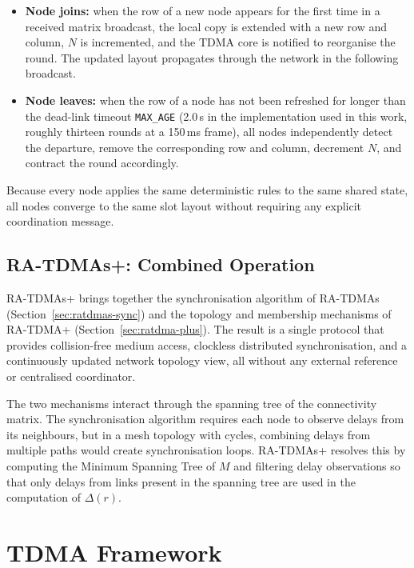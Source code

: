 \begin{itemize}
  \item \textbf{Node joins:} when the row of a new node appears for the
    first time in a received matrix broadcast, the local copy is
    extended with a new row and column, $N$ is incremented, and the
    TDMA core is notified to reorganise the round. The updated layout
    propagates through the network in the following broadcast.

  \item \textbf{Node leaves:} when the row of a node has not been refreshed
    for longer than the dead-link timeout \texttt{MAX\_AGE} (2.0\,s in
    the implementation used in this work, roughly thirteen rounds at a
    150\,ms frame), all nodes independently detect the departure,
    remove the corresponding row and column, decrement $N$, and contract
    the round accordingly.
\end{itemize}

Because every node applies the same deterministic rules to the same
shared state, all nodes converge to the same slot layout without
requiring any explicit coordination message.

\subsection{RA-TDMAs+: Combined Operation}

RA-TDMAs+ brings together the synchronisation algorithm of RA-TDMAs
(Section~\ref{sec:ratdmas-sync}) and the topology and membership
mechanisms of RA-TDMA+ (Section~\ref{sec:ratdma-plus}). The result
is a single protocol that provides collision-free medium access,
clockless distributed synchronisation, and a continuously updated
network topology view, all without any external reference or
centralised coordinator.

The two mechanisms interact through the spanning tree of the
connectivity matrix. The synchronisation algorithm requires each
node to observe delays from its neighbours, but in a mesh topology
with cycles, combining delays from multiple paths would create
synchronisation loops. RA-TDMAs+ resolves this by computing the
Minimum Spanning Tree of $M$ and filtering delay observations so
that only delays from links present in the spanning tree are used
in the computation of $\Delta(r)$.


\section{TDMA Framework}
\label{sec:framework}


